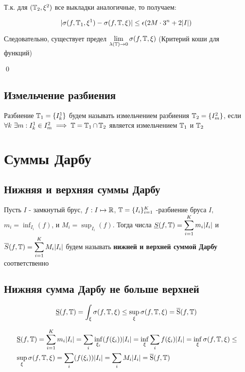 \documentclass[a4paper, 10pt]{article}
\begin{document}
\begin{itemize}
    Т.к. для $(\operatorname{\mathbb{T}}_2, \xi^2)$ все выкладки аналогичные, то получаем:
    
    \begin{equation*}
         |\sigma(f, \operatorname{\mathbb{T}}_1, \xi^1) - \sigma(f, \operatorname{\mathbb{T}}, \xi)| \le \epsilon(2M\cdot 3^n + 2|I|)
    \end{equation*}

        Следовательно, существует предел $\displaystyle\lim_{\lambda(\operatorname{\mathbb{T}})\to0}\sigma(f, \operatorname{\mathbb{T}}, \xi)$ (Критерий коши для функций)
\end{itemize} \qed

\subsection{Измельчение разбиения}
 Разбиение $\operatorname{\mathbb{T}}_1 = \{I^1_k\}$ будем называть измельчением разбиения $\operatorname{\mathbb{T}}_2 = \{I^2_m\}$, если $\forall k \,\, \exists m: I_k^1 \in I_m^2 \implies \operatorname{\mathbb{T}} = \operatorname{\mathbb{T}}_1\cap \operatorname{\mathbb{T}}_2$ является измельчением $\operatorname{\mathbb{T}}_1$ и $\operatorname{\mathbb{T}}_2$



\newpage
\section{Суммы Дарбу}
\subsection{Нижняя и верхняя суммы Дарбу}
 Пусть $I$ - замкнутый брус, $f: I\mapsto \operatorname{\mathbb{R}}$, $\operatorname{\mathbb{T}} = \{I_i\}_{i=1}^{K}$ -разбиение бруса $I$, $m_i = \displaystyle\inf_{I_i} (f)$, и $M_i = \displaystyle\sup_{I_i} (f)$. Тогда числа $\underline{S}(f, \T) = \sum_{i=1}^{K}m_i|I_i|$ и $\overline{S}(f, \T) = \sum_{i=1}^KM_i|I_i|$ будем называть \textbf{нижней и верхней суммой Дарбу} соответственно

\subsection{Нижняя сумма Дарбу не больше верхней}
\theorem \begin{equation*}
    \operatorname{\underline{S}}(f, \operatorname{\mathbb{T}}) = \int_{\xi}\sigma(f, \operatorname{\mathbb{T}}, \xi) \le \sup_{\xi}\sigma(f, \operatorname{\mathbb{T}}, \xi) = \operatorname{\overline{S}}(f, \operatorname{\mathbb{T}})
\end{equation*}

\proof
\begin{equation*}
    \begin{aligned}
    &\us(f, \T) = \sum_{i=1}^{K}m_i|I_i| = \sum_{i}\inf_{\xi_i}(f(\xi_i))|I_i| = \inf_{\xi}\sum_{i}f(\xi_i)|I_i| = \inf_{\xi}\sigma(f, \T, \xi) \le\\
    &\sup_{\xi}\sigma(f, \T, \xi) = \sum_i (f(\xi_i))|I_i| = \sum_{i}M_i|I_i| = \os(f, \T)
    \end{aligned}
    \end{equation*}
\end{document}
